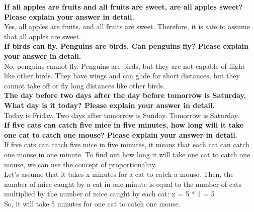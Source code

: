 \documentclass[11pt]{article}
\begin{document}
\begin{tcolorbox}[colback=white,colframe=black!75!black,title=RWKV-4-Raven-14B,float=h]%
\textbf{If all apples are fruits and all fruits are sweet, are all apples sweet? Please explain your answer in detail.}\\

Yes, all apples are fruits, and all fruits are sweet. Therefore, it is safe to assume that all apples are sweet.\\

\textbf{If birds can fly. Penguins are birds. Can penguins fly? Please explain your answer in detail.}\\

No, penguins cannot fly. Penguins are birds, but they are not capable of flight like other birds. They have wings and can glide for short distances, but they cannot take off or fly long distances like other birds.\\

\textbf{The day before two days after the day before tomorrow is Saturday. What day is it today? Please explain your answer in detail.}\\

Today is Friday. Two days after tomorrow is Sunday. Tomorrow is Saturday.\\

\textbf{If five cats can catch five mice in five minutes, how long will it take one cat to catch one mouse? Please explain your answer in detail.}\\

If five cats can catch five mice in five minutes, it means that each cat can catch one mouse in one minute.
To find out how long it will take one cat to catch one mouse, we can use the concept of proportionality.\\ Let's assume that it takes x minutes for a cat to catch a mouse. Then, the number of mice caught by a cat in one minute is equal to the number of cats multiplied by the number of mice caught by each cat:
x = 5 * 1 = 5\\
So, it will take 5 minutes for one cat to catch one mouse.\\
\end{tcolorbox}
\end{document}
